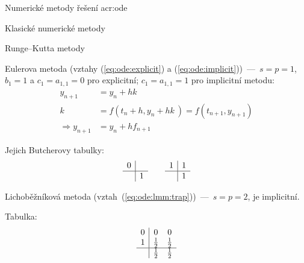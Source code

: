 \documentclass[thesis=M,czech]{FITthesis}[2012/06/26]
\newcommand{\acrlabel}[1]{acr:#1}
\newcommand{\acr}[1]{\acrshort{\acrlabel{#1}}}
\newcommand{\rf}[1]{\ref{#1}}
\newcommand{\rfeq}[1]{(\rf{eq:#1})}
\begin{document}
\begin{section}{Numerické metody řešení \acr{ode}}
\begin{subsection}{Klasické numerické metody}
\begin{subsubsection}{Runge--Kutta metody}
\begin{paragraph}{Eulerova metoda}\label{sss:search:ode:classic:rk:euler}
(vztahy \rfeq{ode:explicit}
a \rfeq{ode:implicit})~---~${s = p = 1}$,
${b_{1} = 1}$ a
${c_{1} = a_{1,1} = 0}$ pro explicitní;
${c_{1} = a_{1,1} = 1}$ pro implicitní metodu:
\begin{equation*}
\begin{split}
   y_{n+1}             &= y_{n} + h k~\\
   k~&= f \! \left( t_{n} + h, y_{n} + h k~\right)
      = f \! \left( t_{n+1}, y_{n+1} \right) \\
   \Rightarrow y_{n+1} &= y_{n} + h f_{n+1}
\end{split}
\end{equation*}

Jejich Butcherovy tabulky:
\begin{equation*}
\begin{array}{r|c}
   0  &   \\ \hline
      & 1
\end{array}
\qquad
\begin{array}{r|c}
   1  & 1 \\ \hline
      & 1
\end{array}
\end{equation*}
\end{paragraph} %


\begin{paragraph}{Lichoběžníková metoda}
\label{sss:search:ode:classic:rk:trap}
(vztah~\rfeq{ode:lmm:trap})~---~${s = p = 2}$, je implicitní.

Tabulka:
\begin{equation*}
\begin{array}{r|cc}
   0  &           0 &           0 \\
   1  & \frac{1}{2} & \frac{1}{2} \\ \hline
      & \frac{1}{2} & \frac{1}{2}
\end{array}
\end{equation*}
\end{paragraph} %



\end{subsubsection}
\end{subsection}
\end{section}
\end{document}
